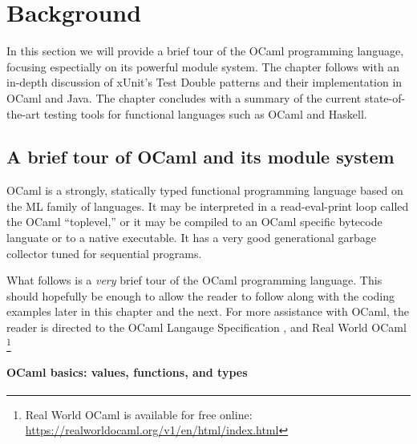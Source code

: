 \chapter{Background}
\label{background}

In this section we will provide a brief tour of the OCaml programming
language, focusing espectially on its powerful module system. The
chapter follows with an in-depth discussion of xUnit's Test Double
patterns and their implementation in OCaml and Java. The chapter
concludes with a summary of the current state-of-the-art testing tools
for functional languages such as OCaml and Haskell.

\section{A brief tour of OCaml and its module system}
\label{ocaml}



OCaml is a strongly, statically typed functional programming language
based on the ML family of languages. It may be interpreted in a
read-eval-print loop called the OCaml ``toplevel,'' or it may be
compiled to an OCaml specific bytecode languate or to a native
executable. \cite{ocaml:spec} It has a very good generational garbage
collector tuned for sequential programs. \cite{ocaml:gc_tutorial}

What follows is a \textit{very} brief tour of the OCaml programming
language. This should hopefully be enough to allow the reader to
follow along with the coding examples later in this chapter and the
next. For more assistance with OCaml, the reader is directed to the
OCaml Langauge Specification \cite{ocaml:spec}, and Real World OCaml
\cite{rwo}\footnote{Real World OCaml is available for free online:
  \url{https://realworldocaml.org/v1/en/html/index.html}}

\subsubsection{OCaml basics: values, functions, and types}

